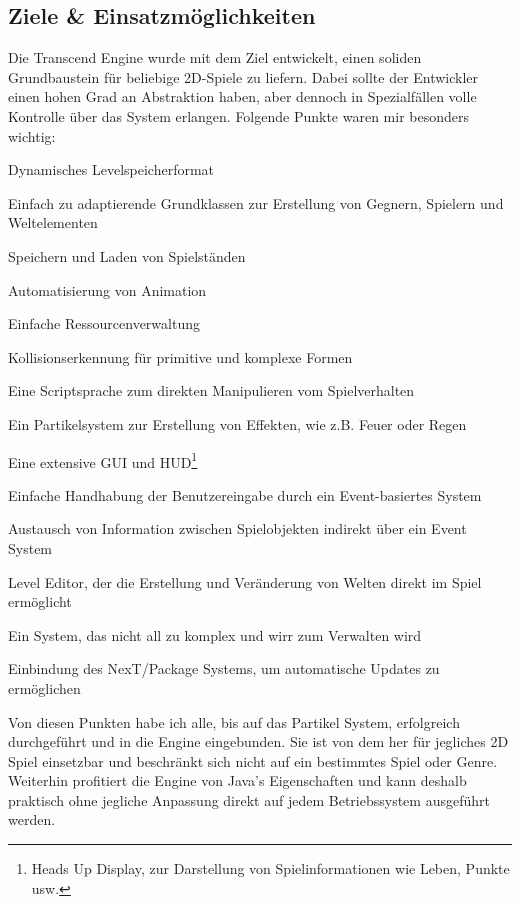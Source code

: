 \documentclass[12pt,a4paper,titlepage]{article}
\begin{document}
	\subsection{Ziele \& Einsatzmöglichkeiten}
		Die Transcend Engine wurde mit dem Ziel entwickelt, einen soliden Grundbaustein für beliebige 2D-Spiele zu liefern. Dabei sollte der Entwickler einen hohen Grad an Abstraktion haben, aber dennoch in Spezialfällen volle Kontrolle über das System erlangen. Folgende Punkte waren mir besonders wichtig:
		\begin{itemize*}
			\item Dynamisches Levelspeicherformat
			\item Einfach zu adaptierende Grundklassen zur Erstellung von Gegnern, Spielern und Weltelementen
			\item Speichern und Laden von Spielständen
			\item Automatisierung von Animation
			\item Einfache Ressourcenverwaltung
			\item Kollisionserkennung für primitive und komplexe Formen
			\item Eine Scriptsprache zum direkten Manipulieren vom Spielverhalten
			\item Ein Partikelsystem zur Erstellung von Effekten, wie z.B. Feuer oder Regen
			\item Eine extensive GUI und HUD\footnote{Heads Up Display, zur Darstellung von Spielinformationen wie Leben, Punkte usw.}
			\item Einfache Handhabung der Benutzereingabe durch ein Event-basiertes System
			\item Austausch von Information zwischen Spielobjekten indirekt über ein Event System
			\item Level Editor, der die Erstellung und Veränderung von Welten direkt im Spiel ermöglicht
			\item Ein System, das nicht all zu komplex und wirr zum Verwalten wird
			\item Einbindung des NexT/Package Systems, um automatische Updates zu ermöglichen
		\end{itemize*}
		Von diesen Punkten habe ich alle, bis auf das Partikel System, erfolgreich durchgeführt und in die Engine eingebunden. Sie ist von dem her für jegliches 2D Spiel einsetzbar und beschränkt sich nicht auf ein bestimmtes Spiel oder Genre. Weiterhin profitiert die Engine von Java's Eigenschaften und kann deshalb praktisch ohne jegliche Anpassung direkt auf jedem Betriebssystem ausgeführt werden.\\
		
\end{document}
